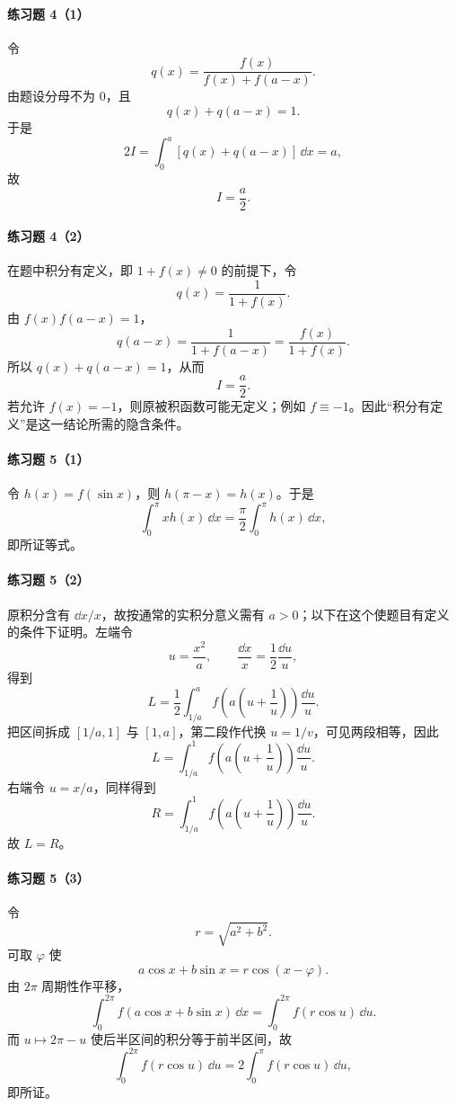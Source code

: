 \paragraph{练习题 4（1）}
\begin{xsolution}
令
\[
  q(x)=\frac{f(x)}{f(x)+f(a-x)}.
\]
由题设分母不为 $0$，且
\[
  q(x)+q(a-x)=1.
\]
于是
\[
  2I=\int_0^a[q(x)+q(a-x)]\,\dd x=a,
\]
故
\[
  \boxed{I=\frac a2}.
\]
\end{xsolution}

\paragraph{练习题 4（2）}
\begin{xsolution}
在题中积分有定义，即 $1+f(x)\ne0$ 的前提下，令
\[
  q(x)=\frac1{1+f(x)}.
\]
由 $f(x)f(a-x)=1$，
\[
  q(a-x)=\frac1{1+f(a-x)}
  =\frac{f(x)}{1+f(x)}.
\]
所以 $q(x)+q(a-x)=1$，从而
\[
  \boxed{I=\frac a2}.
\]
若允许 $f(x)=-1$，则原被积函数可能无定义；例如 $f\equiv-1$。因此“积分有定义”是这一结论所需的隐含条件。
\end{xsolution}

\paragraph{练习题 5（1）}
\begin{xsolution}
令 $h(x)=f(\sin x)$，则 $h(\pi-x)=h(x)$。于是
\[
  \int_0^\pi xh(x)\,\dd x
  =\frac\pi2\int_0^\pi h(x)\,\dd x,
\]
即所证等式。
\end{xsolution}

\paragraph{练习题 5（2）}
\begin{xsolution}
原积分含有 $\dd x/x$，故按通常的实积分意义需有 $a>0$；以下在这个使题目有定义的条件下证明。左端令
\[
  u=\frac{x^2}{a},
  \qquad
  \frac{\dd x}{x}=\frac12\frac{\dd u}{u},
\]
得到
\[
  L=\frac12\int_{1/a}^{a}f\left(a\left(u+\frac1u\right)\right)\frac{\dd u}{u}.
\]
把区间拆成 $[1/a,1]$ 与 $[1,a]$，第二段作代换 $u=1/v$，可见两段相等，因此
\[
  L=\int_{1/a}^{1}f\left(a\left(u+\frac1u\right)\right)\frac{\dd u}{u}.
\]
右端令 $u=x/a$，同样得到
\[
  R=\int_{1/a}^{1}f\left(a\left(u+\frac1u\right)\right)\frac{\dd u}{u}.
\]
故 $L=R$。
\end{xsolution}

\paragraph{练习题 5（3）}
\begin{xsolution}
令
\[
  r=\sqrt{a^2+b^2}.
\]
可取 $\varphi$ 使
\[
  a\cos x+b\sin x=r\cos(x-\varphi).
\]
由 $2\pi$ 周期性作平移，
\[
  \int_0^{2\pi}f(a\cos x+b\sin x)\,\dd x
  =\int_0^{2\pi}f(r\cos u)\,\dd u.
\]
而 $u\mapsto2\pi-u$ 使后半区间的积分等于前半区间，故
\[
  \int_0^{2\pi}f(r\cos u)\,\dd u
  =2\int_0^\pi f(r\cos u)\,\dd u,
\]
即所证。
\end{xsolution}

